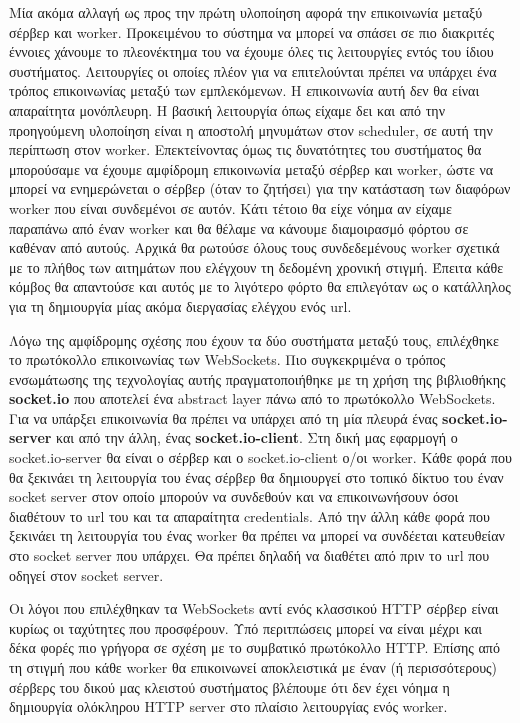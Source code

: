 Μία ακόμα αλλαγή ως προς την πρώτη υλοποίηση αφορά την επικοινωνία μεταξύ σέρβερ και worker. Προκειμένου το σύστημα να
μπορεί να σπάσει σε πιο διακριτές έννοιες χάνουμε το πλεονέκτημα του να έχουμε όλες τις λειτουργίες εντός του ίδιου συστήματος.
Λειτουργίες οι οποίες πλέον για να επιτελούνται πρέπει να υπάρχει ένα τρόπος επικοινωνίας μεταξύ των εμπλεκόμενων.
Η επικοινωνία αυτή δεν θα είναι απαραίτητα μονόπλευρη. Η βασική λειτουργία όπως είχαμε δει και από την προηγούμενη υλοποίηση
είναι η αποστολή μηνυμάτων στον scheduler, σε αυτή την περίπτωση στον worker. Επεκτείνοντας όμως τις δυνατότητες του συστήματος
θα μπορούσαμε να έχουμε αμφίδρομη επικοινωνία μεταξύ σέρβερ και worker, ώστε να μπορεί να ενημερώνεται ο σέρβερ (όταν το ζητήσει) για την
κατάσταση των διαφόρων worker που είναι συνδεμένοι σε αυτόν. Κάτι τέτοιο θα είχε νόημα αν είχαμε παραπάνω από έναν worker και θα θέλαμε να κάνουμε
διαμοιρασμό φόρτου σε καθέναν από αυτούς. Αρχικά θα ρωτούσε όλους τους συνδεδεμένους worker σχετικά με το πλήθος των αιτημάτων
που ελέγχουν τη δεδομένη χρονική στιγμή. Έπειτα κάθε κόμβος θα απαντούσε και αυτός με το λιγότερο φόρτο θα επιλεγόταν ως ο κατάλληλος
για τη δημιουργία μίας ακόμα διεργασίας ελέγχου ενός url.

Λόγω της αμφίδρομης σχέσης που έχουν τα δύο συστήματα μεταξύ τους, επιλέχθηκε το πρωτόκολλο επικοινωνίας των WebSockets.
Πιο συγκεκριμένα ο τρόπος ενσωμάτωσης της τεχνολογίας αυτής πραγματοποιήθηκε με τη χρήση της βιβλιοθήκης \textbf{socket.io} που αποτελεί ένα
abstract layer πάνω από το πρωτόκολλο WebSockets. Για να υπάρξει επικοινωνία θα πρέπει να υπάρχει από τη μία πλευρά ένας \textbf{socket.io-server} και από την άλλη, ένας \textbf{socket.io-client}.
Στη δική μας εφαρμογή ο socket.io-server θα είναι ο σέρβερ και ο socket.io-client ο/οι worker. Κάθε φορά που θα ξεκινάει τη λειτουργία του ένας σέρβερ θα δημιουργεί στο τοπικό δίκτυο του
έναν socket server στον οποίο μπορούν να συνδεθούν και να επικοινωνήσουν όσοι διαθέτουν το url του και τα απαραίτητα credentials. Από την άλλη
κάθε φορά που ξεκινάει τη λειτουργία του ένας worker θα πρέπει να μπορεί να συνδέεται κατευθείαν στο socket server που υπάρχει.
Θα πρέπει δηλαδή να διαθέτει από πριν το url που οδηγεί στον socket server.

Οι λόγοι που επιλέχθηκαν τα WebSockets αντί ενός κλασσικού HTTP σέρβερ είναι κυρίως οι ταχύτητες που προσφέρουν. Υπό περιτπώσεις
μπορεί να είναι μέχρι και δέκα φορές πιο γρήγορα σε σχέση με το συμβατικό πρωτόκολλο HTTP. Επίσης από τη στιγμή που κάθε worker
θα επικοινωνεί αποκλειστικά με έναν (ή περισσότερους) σέρβερς του δικού μας κλειστού συστήματος βλέπουμε ότι δεν έχει νόημα η δημιουργία ολόκληρου HTTP server στο πλαίσιο λειτουργίας ενός worker.


